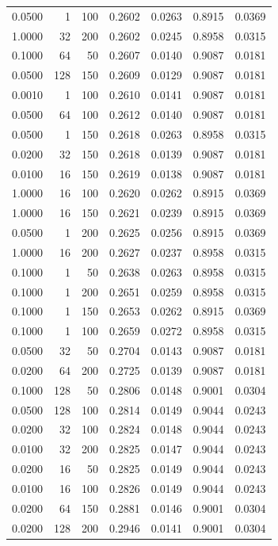 \begin{tabular}{rrrrrrr}
0.0500 & 1 & 100 & 0.2602 & 0.0263 & 0.8915 & 0.0369 \\
1.0000 & 32 & 200 & 0.2602 & 0.0245 & 0.8958 & 0.0315 \\
0.1000 & 64 & 50 & 0.2607 & 0.0140 & 0.9087 & 0.0181 \\
0.0500 & 128 & 150 & 0.2609 & 0.0129 & 0.9087 & 0.0181 \\
0.0010 & 1 & 100 & 0.2610 & 0.0141 & 0.9087 & 0.0181 \\
0.0500 & 64 & 100 & 0.2612 & 0.0140 & 0.9087 & 0.0181 \\
0.0500 & 1 & 150 & 0.2618 & 0.0263 & 0.8958 & 0.0315 \\
0.0200 & 32 & 150 & 0.2618 & 0.0139 & 0.9087 & 0.0181 \\
0.0100 & 16 & 150 & 0.2619 & 0.0138 & 0.9087 & 0.0181 \\
1.0000 & 16 & 100 & 0.2620 & 0.0262 & 0.8915 & 0.0369 \\
1.0000 & 16 & 150 & 0.2621 & 0.0239 & 0.8915 & 0.0369 \\
0.0500 & 1 & 200 & 0.2625 & 0.0256 & 0.8915 & 0.0369 \\
1.0000 & 16 & 200 & 0.2627 & 0.0237 & 0.8958 & 0.0315 \\
0.1000 & 1 & 50 & 0.2638 & 0.0263 & 0.8958 & 0.0315 \\
0.1000 & 1 & 200 & 0.2651 & 0.0259 & 0.8958 & 0.0315 \\
0.1000 & 1 & 150 & 0.2653 & 0.0262 & 0.8915 & 0.0369 \\
0.1000 & 1 & 100 & 0.2659 & 0.0272 & 0.8958 & 0.0315 \\
0.0500 & 32 & 50 & 0.2704 & 0.0143 & 0.9087 & 0.0181 \\
0.0200 & 64 & 200 & 0.2725 & 0.0139 & 0.9087 & 0.0181 \\
0.1000 & 128 & 50 & 0.2806 & 0.0148 & 0.9001 & 0.0304 \\
0.0500 & 128 & 100 & 0.2814 & 0.0149 & 0.9044 & 0.0243 \\
0.0200 & 32 & 100 & 0.2824 & 0.0148 & 0.9044 & 0.0243 \\
0.0100 & 32 & 200 & 0.2825 & 0.0147 & 0.9044 & 0.0243 \\
0.0200 & 16 & 50 & 0.2825 & 0.0149 & 0.9044 & 0.0243 \\
0.0100 & 16 & 100 & 0.2826 & 0.0149 & 0.9044 & 0.0243 \\
0.0200 & 64 & 150 & 0.2881 & 0.0146 & 0.9001 & 0.0304 \\
0.0200 & 128 & 200 & 0.2946 & 0.0141 & 0.9001 & 0.0304 \\

\end{tabular}
